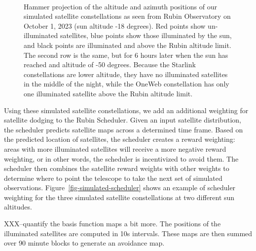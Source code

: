 \documentclass[linenumbers]{aastex631}
\begin{document}
\begin{figure}[ht!]
\\
\caption{Hammer projection of the altitude and azimuth positions of our simulated satellite constellations as seen from Rubin Observatory on October 1, 2023 (sun altitude -18 degrees). Red points show un-illuminated satellites, blue points show those illuminated by the sun, and black points are illuminated and above the Rubin altitude limit. The second row is the same, but for 6 hours later when the sun has reached and altitude of -50 degrees. Because the Starlink constellations are lower altitude, they have no illuminated satellites in the middle of the night, while the OneWeb constellation has only one illuminated satellite above the Rubin altitude limit. \label{fig-simulated-constellations} }
\end{figure}

Using these simulated satellite constellations, we add an additional weighting for satellite dodging to the Rubin Scheduler. Given an input satellite distribution, the scheduler predicts satellite maps across a determined time frame. Based on the predicted location of satellites, the scheduler creates a reward weighting: areas with more illuminated satellites will receive a more negative reward weighting, or in other words, the scheduler is incentivized to avoid them. The scheduler then combines the satellite reward weights with other weights to determine where to point the telescope to take the next set of simulated observations. Figure~\ref{fig-simulated-scheduler} shows an example of scheduler weighting for the three simulated satellite constellations at two different sun altitudes.

XXX--quantify the basis function maps a bit more. The positions of the illuminated satellites are computed in 10s intervals. These maps are then summed over 90 minute blocks to generate an avoidance map. 
\end{document}
